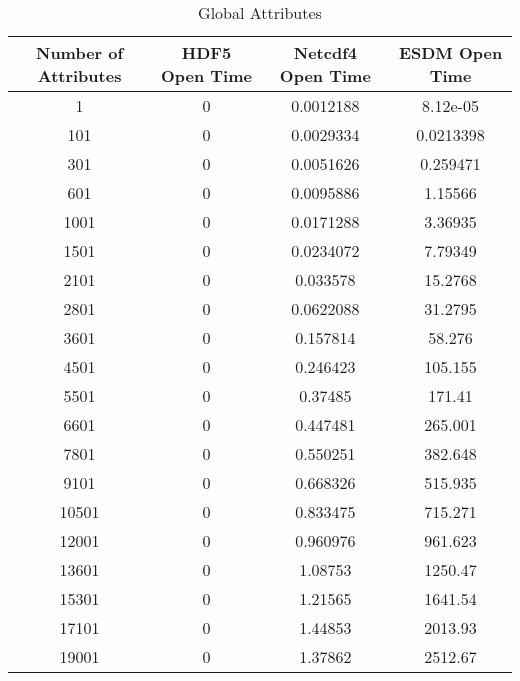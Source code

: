 \begin{table}[H]
\centering
\begin{tabular}{|c|c|c|c|}
\hline
Number of Attributes  & HDF5 Open Time & Netcdf4 Open Time & ESDM Open Time \\ \hline \hline
1                     &  0                  &   0.0012188                    &      8.12e-05           \\ \hline
101                   &   0                 &   0.0029334                    &      0.0213398            \\ \hline
301                   &    0                &   0.0051626                    &      0.259471            \\ \hline
601                   &     0               &   0.0095886                    &      1.15566             \\ \hline
1001                  &      0              &   0.0171288                    &      3.36935             \\ \hline
1501                  &       0             &   0.0234072                    &     7.79349              \\ \hline
2101                  &        0            &   0.033578                     &     15.2768              \\ \hline
2801 & 0 & 0.0622088 & 31.2795 \\ \hline
3601 & 0 & 0.157814 & 58.276 \\ \hline
4501 & 0 & 0.246423 & 105.155 \\ \hline
5501 & 0 & 0.37485 & 171.41 \\ \hline
6601 & 0 & 0.447481 & 265.001 \\ \hline
7801 & 0 & 0.550251 & 382.648 \\ \hline
9101 & 0 & 0.668326 & 515.935 \\ \hline
10501 & 0 & 0.833475 & 715.271 \\ \hline
12001 & 0 & 0.960976 & 961.623 \\ \hline
13601 & 0 & 1.08753 & 1250.47 \\ \hline
15301 & 0 & 1.21565 & 1641.54 \\ \hline
17101 & 0 & 1.44853 & 2013.93 \\ \hline
19001 & 0 & 1.37862 & 2512.67 \\ \hline
\hline
\end{tabular}
\caption{\label{tab:global_atts} Global Attributes}
\end{table}

